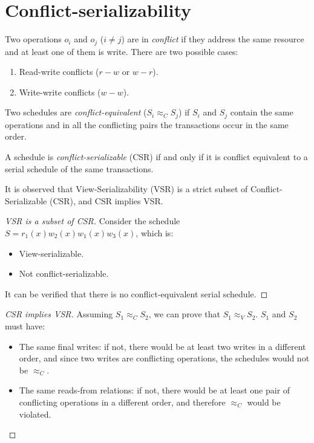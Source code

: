 \section{Conflict-serializability}

\begin{definition}
    Two operations $o_i$ and $o_j$ ($i \neq j$) are in \emph{conflict} if they address the same resource and at least one of them is write. 
    There are two possible cases:
    \begin{enumerate}
        \item Read-write conflicts ($r-w$ or $w-r$).
        \item Write-write conflicts ($w-w$).
    \end{enumerate}

    Two schedules are \emph{conflict-equivalent} ($S_i \approx_C S_j$) if $S_i$ and $S_j$ contain the same operations and in all the conflicting pairs the transactions occur in the same order. 

    A schedule is \emph{conflict-serializable} (CSR) if and only if it is conflict equivalent to a serial schedule of the same transactions. 
\end{definition}
It is observed that View-Serializability (VSR) is a strict subset of Conflict-Serializable (CSR), and CSR implies VSR.
\begin{proof}[VSR is a subset of CSR]
    Consider the schedule $S = r_1(x) w_2(x) w_1(x) w_3(x)$, which is:
    \begin{itemize}
        \item View-serializable.
        \item Not conflict-serializable.
    \end{itemize}
    It can be verified that there is no conflict-equivalent serial schedule.
\end{proof}
\begin{proof}[CSR implies VSR]
    Assuming $S_1 \approx_C S_2$, we can prove that $S_1 \approx_V S_2$. 
    $S_1$ and $S_2$ must have: 
    \begin{itemize}
        \item The same final writes: if not, there would be at least two writes in a different order, and since two writes are conflicting operations, the schedules would not be $\approx_C$.
        \item The same reads-from relations: if not, there would be at least one pair of conflicting operations in a different order, and therefore $\approx_C$ would be violated.
    \end{itemize}
\end{proof}
